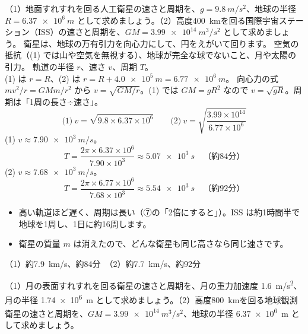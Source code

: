 \begin{phreidai}[人工衛星の速さと周期]
\label{ph:力-2:ex10}（1）地面すれすれを回る人工衛星の速さと周期を、$g=\qty{9.8}{m/s^2}$、地球の半径 $R=\qty{6.37e6}{m}$ として求めましょう。（2）高度\qty{400}{km}を回る国際宇宙ステーション（ISS）の速さと周期を、$GM=\allowbreak\qty{3.99e14}{m^3/s^2}$ として求めましょう。
\phbamen
衛星は、地球の万有引力を向心力にして、円をえがいて回ります。
\phmushi
空気の抵抗（(1) では山や空気を無視する）、地球が完全な球でないこと、月や太陽の引力。
\phzu
軌道の半径 $r$、速さ $v$、周期 $T$。\\(1) は $r=R$、(2) は $r=R+\qty{4.0e5}{m}=\qty{6.77e6}{m}$。
\phriyu
向心力の式 $mv^2/r=GMm/r^2$ から $v=\sqrt{GM/r}$。(1) では $GM=gR^2$ なので $v=\sqrt{gR}$。周期は「1周の長さ÷速さ」。
\phtateru
\[ \text{(1)}\ v=\sqrt{9.8\times6.37\times10^6}\qquad \text{(2)}\ v=\sqrt{\frac{3.99\times10^{14}}{6.77\times10^6}} \]
\phtoku
(1) $v\approx\qty{7.90e3}{m/s}$。
\[ T=\frac{2\pi\times6.37\times10^6}{7.90\times10^3}\approx\qty{5.07e3}{s}\quad\text{（約84分）} \]
(2) $v\approx\qty{7.68e3}{m/s}$。
\[ T=\frac{2\pi\times6.77\times10^6}{7.68\times10^3}\approx\qty{5.54e3}{s}\quad\text{（約92分）} \]
\phtashikame
\begin{itemize}[leftmargin=1.2\zw, itemsep=1pt, topsep=1pt, label={\color{bkTheme}●}]
\item 高い軌道ほど遅く、周期は長い（⑦の「2倍にすると」）。ISS は約1時間半で地球を1周し、1日に約16周します。
\item 衛星の質量 $m$ は消えたので、どんな衛星も同じ高さなら同じ速さです。
\end{itemize}
\kotae （1）約\qty{7.9}{km/s}、約84分　（2）約\qty{7.7}{km/s}、約92分
\end{phreidai}
\begin{jibun}
（1）月の表面すれすれを回る衛星の速さと周期を、月の重力加速度 \qty{1.6}{m/s^2}、月の半径 \qty{1.74e6}{m} として求めましょう。（2）高度\qty{800}{km}を回る地球観測衛星の速さと周期を、$GM=\allowbreak\qty{3.99e14}{m^3/s^2}$、地球の半径 \qty{6.37e6}{m} として求めましょう。
\end{jibun}

